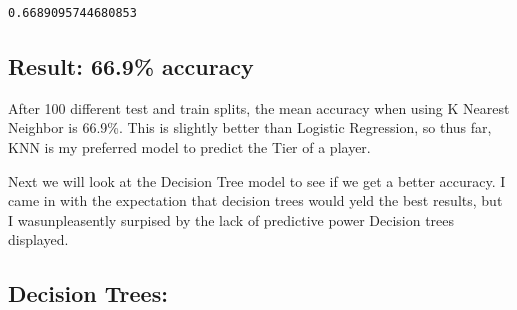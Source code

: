 \documentclass[11pt]{article}
\begin{document}
    \begin{Verbatim}[commandchars=\\\{\}]
0.6689095744680853

    \end{Verbatim}

    \subsection{Result: 66.9\% accuracy}\label{result-66.9-accuracy}

After 100 different test and train splits, the mean accuracy when using
K Nearest Neighbor is 66.9\%. This is slightly better than Logistic
Regression, so thus far, KNN is my preferred model to predict the Tier
of a player.

Next we will look at the Decision Tree model to see if we get a better
accuracy. I came in with the expectation that decision trees would yeld
the best results, but I wasunpleasently surpised by the lack of
predictive power Decision trees displayed. 

    \subsection{Decision Trees:}\label{decision-trees}
\end{document}
